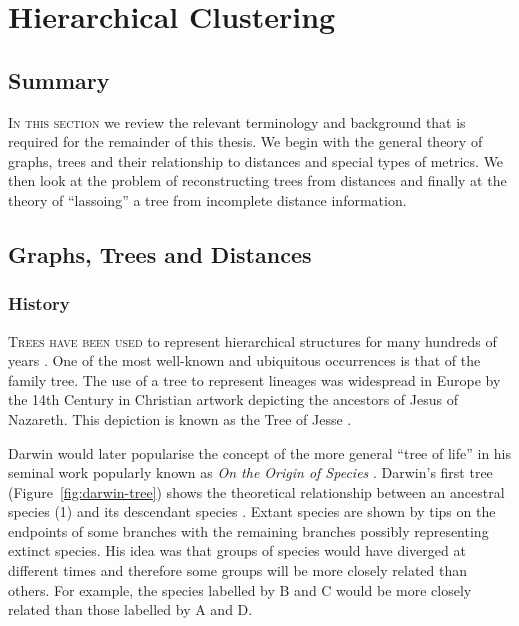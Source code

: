 \chapter{Hierarchical Clustering}
\label{cha:background2}

\section{Summary}
\label{sec:summary}

\textsc{In this section} we review the relevant terminology and background
that is required for the remainder of this thesis.  We begin with the general
theory of graphs, trees and their relationship to distances and special types
of metrics.  We then look at the problem of reconstructing trees from
distances and finally at the theory of ``lassoing'' a tree from incomplete
distance information.

\section{Graphs, Trees and Distances}
\label{sec:graphs-trees-dist}

\subsection{History}
\label{sec:history}

\textsc{Trees have been used} to represent hierarchical structures for many
hundreds of years \cite{knuth97taocp1}.  One of the most well-known and
ubiquitous occurrences is that of the family tree.  The use of a tree to
represent lineages was widespread in Europe by the 14th Century in Christian
artwork depicting the ancestors of Jesus of Nazareth.  This depiction is known
as the Tree of Jesse \cite{corblet1860etude}.

Darwin would later popularise the concept of the more general ``tree of life''
in his seminal work popularly known as \textit{On the Origin of Species}
\cite{darwin1859origin}.  Darwin's first tree (Figure~\ref{fig:darwin-tree})
shows the theoretical relationship between an ancestral species (1) and its
descendant species \cite{semple2003phylogenetics}.  Extant species are shown
by tips on the endpoints of some branches with the remaining branches possibly
representing extinct species.  His idea was that groups of species would have
diverged at different times and therefore some groups will be more closely
related than others.  For example, the species labelled by B and C would be
more closely related than those labelled by A and D.

